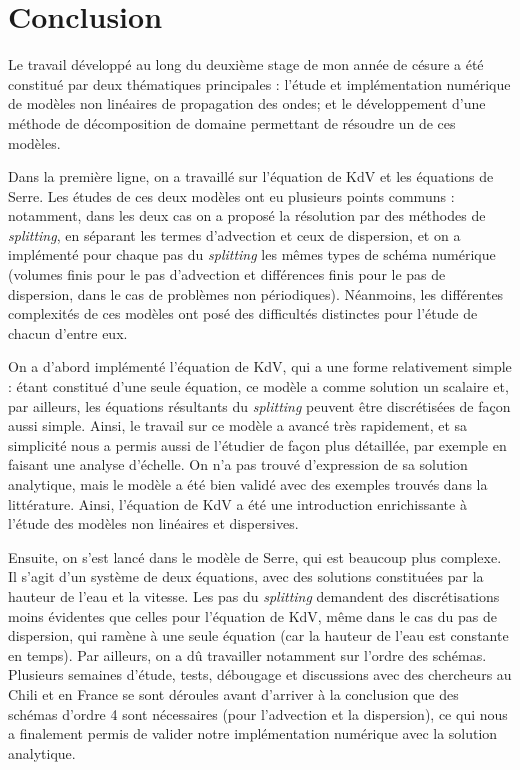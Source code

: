 \section{Conclusion}

\indent Le travail développé au long du deuxième stage de mon année de césure a été constitué par deux thématiques principales : l'étude et implémentation numérique de modèles non linéaires de propagation des ondes; et le développement d'une méthode de décomposition de domaine permettant de résoudre un de ces modèles.

\indent Dans la première ligne, on a travaillé sur l'équation de KdV et les équations de Serre. Les études de ces deux modèles ont eu plusieurs points communs : notamment, dans les deux cas on a proposé la résolution par des méthodes de \emph{splitting}, en séparant les termes d'advection et ceux de dispersion, et on a implémenté pour chaque pas du \emph{splitting} les mêmes types de schéma numérique (volumes finis pour le pas d'advection et différences finis pour le pas de dispersion, dans le cas de problèmes non périodiques). Néanmoins, les différentes complexités de ces modèles ont posé des difficultés distinctes pour l'étude de chacun d'entre eux.

\indent On a d'abord implémenté l'équation de KdV, qui a une forme relativement simple : étant constitué d'une seule équation, ce modèle a comme solution un scalaire et, par ailleurs, les équations résultants du \emph{splitting} peuvent être discrétisées de façon aussi simple. Ainsi, le travail sur ce modèle a avancé très rapidement, et sa simplicité nous a permis aussi de l'étudier de façon plus détaillée, par exemple en faisant une analyse d'échelle. On n'a pas trouvé d'expression de sa solution analytique, mais le modèle a été bien validé avec des exemples trouvés dans la littérature. Ainsi, l'équation de KdV a été une introduction enrichissante à l'étude des modèles non linéaires et dispersives. 

\indent Ensuite, on s'est lancé dans le modèle de Serre, qui est beaucoup plus complexe. Il s'agit d'un système de deux équations, avec des solutions constituées par la hauteur de l'eau et la vitesse. Les pas du \emph{splitting} demandent des discrétisations moins évidentes que celles pour l'équation de KdV, même dans le cas du pas de dispersion, qui ramène à une seule équation (car la hauteur de l'eau est constante en temps). Par ailleurs, on a dû travailler notamment sur l'ordre des schémas. Plusieurs semaines d'étude, tests, débougage et discussions avec des chercheurs au Chili et en France se sont déroules avant d'arriver à la conclusion que des schémas d'ordre 4 sont nécessaires (pour l'advection et la dispersion), ce qui nous a finalement permis de valider notre implémentation numérique avec la solution analytique.

